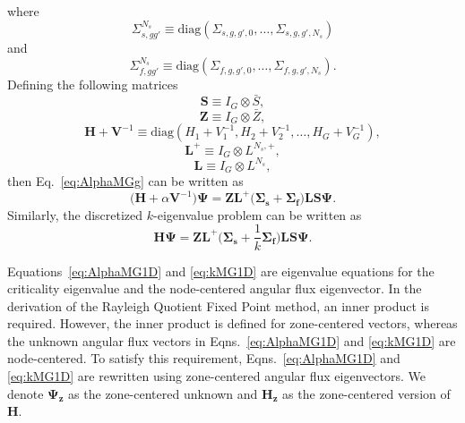 where 
\begin{equation}
\Sigma_{s,gg'}^{N_{s}} \equiv \text{diag}(\Sigma_{s,g,g',0}, \dots, \Sigma_{s,g,g',N_{s}})
\end{equation}
and
\begin{equation}
\Sigma_{f,gg'}^{N_{s}} \equiv \text{diag}(\Sigma_{f,g,g',0}, \dots, \Sigma_{f,g,g',N_{s}}).
\end{equation}
Defining the following matrices 
\begin{equation}
\mathbf{S} \equiv I_{G} \otimes \bar{S},
\end{equation} 
\begin{equation}
\mathbf{Z} \equiv I_{G} \otimes \bar{Z},
\end{equation}
\begin{equation}
\mathbf{H} + \mathbf{V}^{-1} \equiv \text{diag}(H_{1} + V^{-1}_{1}, H_{2} + V^{-1}_{2}, \dots, H_{G} + V^{-1}_{G}),
\end{equation}
\begin{equation}
\mathbf{L}^{+} \equiv I_{G} \otimes L^{N_{s},+},
\end{equation}
\begin{equation}
\mathbf{L} \equiv I_{G} \otimes L^{N_{s}},
\end{equation} 
then Eq.~\ref{eq:AlphaMGg} can be written as
\begin{equation}
	\big ( \mathbf{H} + \alpha \mathbf{V}^{-1} \big ) \mathbf{\Psi} = \mathbf{Z} \mathbf{L}^{+}  \big ( \mathbf{\Sigma_{s}} + \mathbf{\Sigma_{f}} \big )\mathbf{L} \mathbf{S} \mathbf{\Psi}.
	\label{eq:AlphaMG1D}
\end{equation}
Similarly, the discretized $k$-eigenvalue problem can be written as
\begin{equation}
	\mathbf{H}\mathbf{\Psi}  = \mathbf{Z} \mathbf{L}^{+} \bigg ( \mathbf{\Sigma_{s}} + \frac{1}{k} \mathbf{\Sigma_{f}} \bigg ) \mathbf{L} \mathbf{S} \mathbf{\Psi}.
	\label{eq:kMG1D}
\end{equation}

Equations~\ref{eq:AlphaMG1D} and \ref{eq:kMG1D} are eigenvalue equations for the criticality eigenvalue and the node-centered angular flux eigenvector. In the derivation of the Rayleigh Quotient Fixed Point method, an inner product is required. However, the inner product is defined for zone-centered vectors, whereas the unknown angular flux vectors in Eqns.~\ref{eq:AlphaMG1D} and \ref{eq:kMG1D} are node-centered. To satisfy this requirement, Eqns.~\ref{eq:AlphaMG1D} and \ref{eq:kMG1D} are rewritten using zone-centered angular flux eigenvectors. We denote $\mathbf{\Psi_{z}}$ as the zone-centered unknown and $\mathbf{H_{z}}$ as the zone-centered version of $\mathbf{H}$.

